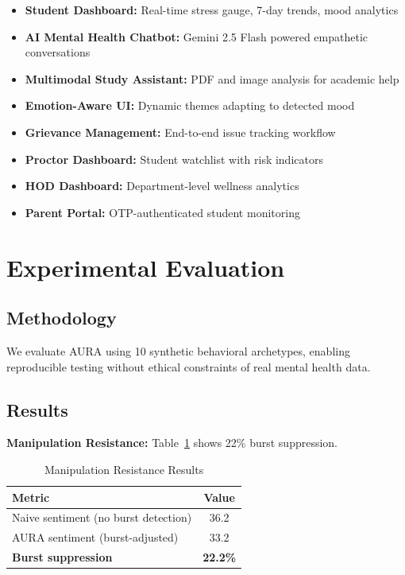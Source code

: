 \documentclass[conference]{IEEEtran}
\begin{document}
\begin{itemize}
    \item \textbf{Student Dashboard:} Real-time stress gauge, 7-day trends, mood analytics
    \item \textbf{AI Mental Health Chatbot:} Gemini 2.5 Flash powered empathetic conversations
    \item \textbf{Multimodal Study Assistant:} PDF and image analysis for academic help
    \item \textbf{Emotion-Aware UI:} Dynamic themes adapting to detected mood
    \item \textbf{Grievance Management:} End-to-end issue tracking workflow
    \item \textbf{Proctor Dashboard:} Student watchlist with risk indicators
    \item \textbf{HOD Dashboard:} Department-level wellness analytics
    \item \textbf{Parent Portal:} OTP-authenticated student monitoring
\end{itemize}

\section{Experimental Evaluation}

\subsection{Methodology}

We evaluate AURA using 10 synthetic behavioral archetypes, enabling reproducible testing without ethical constraints of real mental health data.

\subsection{Results}

\textbf{Manipulation Resistance:} Table~\ref{tab:manipulation} shows 22\% burst suppression.

\begin{table}[htbp]
\caption{Manipulation Resistance Results}
\begin{center}
\begin{tabular}{|l|c|}
\hline
\textbf{Metric} & \textbf{Value} \\
\hline
Naive sentiment (no burst detection) & 36.2 \\
AURA sentiment (burst-adjusted) & 33.2 \\
\textbf{Burst suppression} & \textbf{22.2\%} \\
\hline
\end{tabular}
\label{tab:manipulation}
\end{center}
\end{table}
\end{document}
